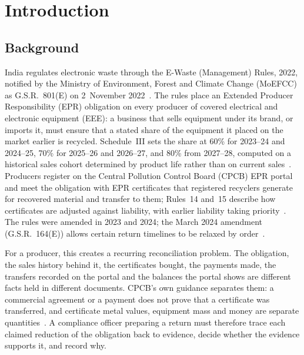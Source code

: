 \chapter{Introduction}

\section{Background}
India regulates electronic waste through the E-Waste (Management) Rules, 2022, notified by the
Ministry of Environment, Forest and Climate Change (MoEFCC) as G.S.R.~801(E) on 2~November
2022~\cite{rules2022}. The rules place an Extended Producer Responsibility (EPR) obligation on
every producer of covered electrical and electronic equipment (EEE): a business that sells
equipment under its brand, or imports it, must ensure that a stated share of the equipment it
placed on the market earlier is recycled. Schedule~III sets the share at 60\% for 2023--24 and
2024--25, 70\% for 2025--26 and 2026--27, and 80\% from 2027--28, computed on a historical sales
cohort determined by product life rather than on current sales~\cite{rules2022}. Producers
register on the Central Pollution Control Board (CPCB) EPR portal and meet the obligation with EPR
certificates that registered recyclers generate for recovered material and transfer to them;
Rules~14 and~15 describe how certificates are adjusted against liability, with earlier liability
taking priority~\cite{rules2022}. The rules were amended in 2023 and 2024; the March 2024
amendment (G.S.R.~164(E)) allows certain return timelines to be relaxed by
order~\cite{amend2024}.

For a producer, this creates a recurring reconciliation problem. The obligation, the sales
history behind it, the certificates bought, the payments made, the transfers recorded on the
portal and the balances the portal shows are different facts held in different documents. CPCB's
own guidance separates them: a commercial agreement or a payment does not prove that a
certificate was transferred, and certificate metal values, equipment mass and money are separate
quantities~\cite{framework,faq2024}. A compliance officer preparing a return must therefore
trace each claimed reduction of the obligation back to evidence, decide whether the evidence
supports it, and record why.

